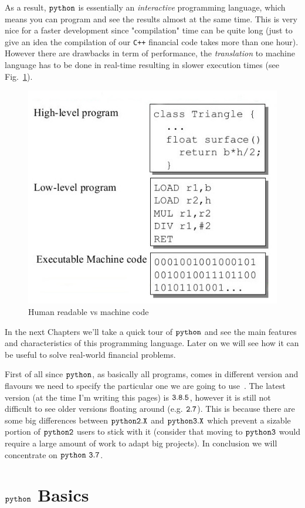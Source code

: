 As a result, \(\tt{python}\) is essentially an \emph{interactive} programming language, which means you can program and see the results almost at the same time. This is very nice for a faster development since "compilation" time can be quite long (just to give an idea the compilation of our \texttt{C++} financial code takes more than one hour).
However there are drawbacks in term of performance, the \emph{translation} to machine language has to be done in real-time resulting in slower execution times (see Fig.~\ref{fig:compilation}).

\begin{figure}[h]
\centering
\includegraphics[width=0.5\linewidth]{figures/machine_language.jpeg}
\caption{Human readable vs machine code}
\label{fig:compilation}
\end{figure}

In the next Chapters we'll take a quick tour of $\tt{python}$ and see the main features and characteristics of this programming language. Later on we will see how it can be useful to solve real-world financial problems.

First of all since $\tt{python}$, as basically all programs, comes in different version and flavours we need to specify the particular one we are going to use~\cite{python_versions}.
The latest version (at the time I'm writing this pages) is \(\tt{3.8.5}\), however it is still not difficult to see older versions floating around (e.g. \(\tt{2.7}\)).
This is because there are some big differences between \(\tt{python 2.X}\) and \(\tt{python 3.X}\) which prevent a sizable portion of \(\tt{python 2}\) users to stick with it (consider that moving to \(\tt{python 3}\) would require a large amount of work to adapt big projects).
In conclusion we will concentrate on \textbf{\(\tt{python~3.7}\)}.

\section{$\tt{python}$ Basics}\label{python-basics}

